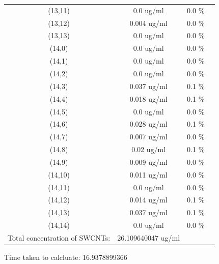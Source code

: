 \documentclass{article}
\begin{document}
\begin{tabular}{c c c c}
(13,11)&        0.0 ug/ml        &0.0 \%\\
(13,12)&        0.004 ug/ml        &0.0 \%\\
(13,13)&        0.0 ug/ml        &0.0 \%\\
(14,0)&        0.0 ug/ml        &0.0 \%\\
(14,1)&        0.0 ug/ml        &0.0 \%\\
(14,2)&        0.0 ug/ml        &0.0 \%\\
(14,3)&        0.037 ug/ml        &0.1 \%\\
(14,4)&        0.018 ug/ml        &0.1 \%\\
(14,5)&        0.0 ug/ml        &0.0 \%\\
(14,6)&        0.028 ug/ml        &0.1 \%\\
(14,7)&        0.007 ug/ml        &0.0 \%\\
(14,8)&        0.02 ug/ml        &0.1 \%\\
(14,9)&        0.009 ug/ml        &0.0 \%\\
(14,10)&        0.011 ug/ml        &0.0 \%\\
(14,11)&        0.0 ug/ml        &0.0 \%\\
(14,12)&        0.014 ug/ml        &0.1 \%\\
(14,13)&        0.037 ug/ml        &0.1 \%\\
(14,14)&        0.0 ug/ml        &0.0 \%\\
Total concentration of SWCNTs: &26.109640047 ug/ml\\

\end{tabular}Time taken to calcluate: 16.9378899366
\end{document}
